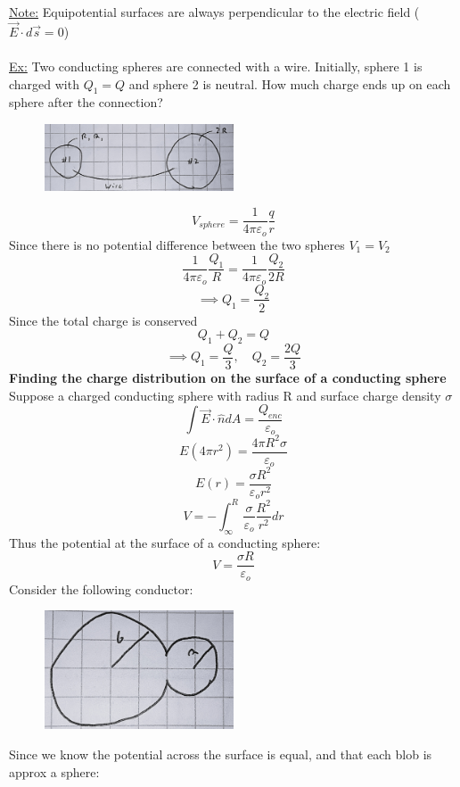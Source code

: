 \documentclass[12pt]{article}
\begin{document}
\begin{enumerate}
\begin{figure}[H]
    \end{figure}
    \underline{Note:} Equipotential surfaces are always perpendicular to the electric field ($\vec{E}\cdot d\vec{s}=0$)\\\\
    \underline{Ex:} Two conducting spheres are connected with a wire. Initially, sphere 1 is charged with $Q_1=Q$ and sphere 2 is neutral. How much charge ends up on each sphere after the connection?
    \begin{figure}[H]
            \centering
            \includegraphics[width=0.5\textwidth]{conductingsphere.JPG}
    \end{figure}
    \[V_{sphere}=\frac{1}{4\pi\varepsilon_o}\frac{q}{r}\]
    Since there is no potential difference between the two spheres $V_1=V_2$
    \[\frac{1}{4\pi\varepsilon_o}\frac{Q_1}{R}=\frac{1}{4\pi\varepsilon_o}\frac{Q_2}{2R}\]
    \[\implies Q_1=\frac{Q_2}{2}\]
    Since the total charge is conserved
    \[Q_1+Q_2=Q\]
    \[\implies Q_1=\frac{Q}{3},\quad Q_2=\frac{2Q}{3}\]
    \textbf{Finding the charge distribution on the surface of a conducting sphere}\\
    Suppose a charged conducting sphere with radius R and surface charge density $\sigma$
    \[\int \vec{E}\cdot\hat{n}dA=\frac{Q_{enc}}{\varepsilon_o}\]
    \[E(4\pi r^2)=\frac{4\pi R^2 \sigma}{\varepsilon_o}\]
    \[E(r)=\frac{\sigma R^2}{\varepsilon_o r^2}\]
    \[V=-\int_{\infty}^{R}\frac{\sigma}{\varepsilon_o}\frac{R^2}{r^2}dr\]
    Thus the potential at the surface of a conducting sphere:
    \[V=\frac{\sigma R}{\varepsilon_o}\]
    Consider the following conductor:
        \begin{figure}[H]
            \centering
            \includegraphics[width=0.5\textwidth]{distribution.JPG}
    \end{figure}
    Since we know the potential across the surface is equal, and that each blob is approx a sphere:

\end{enumerate}
\end{document}
